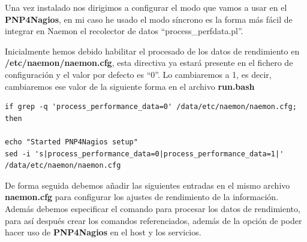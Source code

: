 Una vez instalado nos dirigimos a configurar  el modo que vamos a usar en el \textbf{PNP4Nagios}, en mi caso he usado el modo síncrono es la forma más fácil de integrar en Naemon el recolector de datos “process\_perfdata.pl”.

Inicialmente hemos debido habilitar el procesado de los datos de rendimiento en \textbf{/etc/naemon/naemon.cfg}, esta directiva ya estará presente en el fichero de configuración y el valor por defecto es “0”. Lo cambiaremos a 1, es decir, cambiaremos ese valor de la siguiente forma en el archivo \textbf{run.bash}
\begin{lstlisting}
if grep -q 'process_performance_data=0' /data/etc/naemon/naemon.cfg; then

echo "Started PNP4Nagios setup"
sed -i 's|process_performance_data=0|process_performance_data=1|' /data/etc/naemon/naemon.cfg

\end{lstlisting}
De forma seguida debemos añadir las siguientes entradas en el mismo archivo \textbf{naemon.cfg} para configurar los ajustes de rendimiento de la información. Además debemos especificar el comando para procesar los datos de rendimiento, para así después crear los comandos referenciados, además de la opción de poder hacer uso de \textbf{PNP4Nagios} en el host y los servicios.
\newpage
